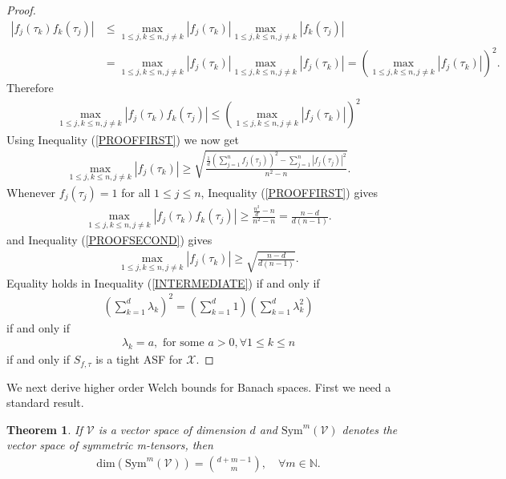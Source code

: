 \documentclass{amsart}
\newtheorem{theorem}{Theorem}[section]
\begin{document}
\begin{proof}
  \begin{align*}
  |f_j(\tau_k)f_k(\tau_j)|&\leq \max _{1\leq j,k \leq n, j\neq k}|f_j(\tau_k)|\max _{1\leq j,k \leq n, j\neq k}|f_k(\tau_j)|\\
  &=\max _{1\leq j,k \leq n, j\neq k}|f_j(\tau_k)|\max _{1\leq j,k \leq n, j\neq k}|f_j(\tau_k)|=\left(\max _{1\leq j,k \leq n, j\neq k}|f_j(\tau_k)|\right)^2.
  \end{align*}
  Therefore 
  \begin{align*}
  \max _{1\leq j,k \leq n, j\neq k}|f_j(\tau_k)f_k(\tau_j)|\leq \left(\max _{1\leq j,k \leq n, j\neq k}|f_j(\tau_k)|\right)^2
  \end{align*}
  Using Inequality (\ref{PROOFFIRST}) we now get 
  	\begin{align}\label{PROOFSECOND}
  \max _{1\leq j,k \leq n, j\neq k}|f_j(\tau_k)|\geq \sqrt{\frac{\frac{1}{d}	\left(\sum_{j=1}^n
  		f_j(\tau_j)\right)^2-	\sum_{j=1}^n
  		|f_j(\tau_j)|^2}{n^2-n}}.
  \end{align}
  Whenever $f_j(\tau_j)=1$ for all $1\leq j \leq n$, Inequality  (\ref{PROOFFIRST}) gives 
  \begin{align*}
\max _{1\leq j,k \leq n, j\neq k}|f_j(\tau_k)f_k(\tau_j)|\geq \frac{\frac{n^2}{d}-n}{n^2-n}=\frac{n-d}{d(n-1)}.
  \end{align*}
   and Inequality (\ref{PROOFSECOND}) gives 
   \begin{align*}
   \max _{1\leq j,k \leq n, j\neq k}|f_j(\tau_k)|\geq \sqrt{\frac{n-d}{d(n-1)}}.
   \end{align*}
   Equality   holds in Inequality  (\ref{INTERMEDIATE}) if and only if 
   \begin{align*}
   \left(\sum_{k=1}^d
   \lambda_k\right)^2= \left(\sum_{k=1}^d1\right) \left(\sum_{k=1}^d
   \lambda_k^2\right)
   \end{align*}
   if and only if 
   \begin{align*}
   \lambda_k=a, \text{ for some } a>0, \forall 1\leq k \leq n
   \end{align*}
   if and only if $S_{f,\tau}$ is a tight ASF for $\mathcal{X}$. 
  \end{proof}
  We next derive higher order Welch bounds for Banach spaces. First we need a standard result.
 
  
  \begin{theorem}\cite{COMON, BOCCI}\label{SYMMETRICTENSORDIMENSION}
  	If $\mathcal{V}$ is a vector space of dimension $d$ and $\text{Sym}^m(\mathcal{V})$ denotes the vector space of symmetric m-tensors, then 
  	\begin{align*}
  		\text{dim}(\text{Sym}^m(\mathcal{V}))={d+m-1 \choose m}, \quad \forall m \in \mathbb{N}.
  	\end{align*}
  \end{theorem}
  
\end{document}
